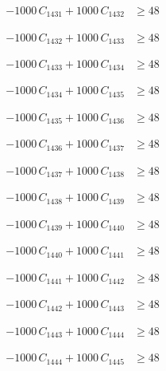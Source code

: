 \documentclass[a4paper,11pt]{article}
\begin{document}
\begin{align}
-1000\,C_{1431} + 1000\,C_{1432} &\geq 48 \nonumber
\end{align}

\begin{align}
-1000\,C_{1432} + 1000\,C_{1433} &\geq 48 \nonumber
\end{align}

\begin{align}
-1000\,C_{1433} + 1000\,C_{1434} &\geq 48 \nonumber
\end{align}

\begin{align}
-1000\,C_{1434} + 1000\,C_{1435} &\geq 48 \nonumber
\end{align}

\begin{align}
-1000\,C_{1435} + 1000\,C_{1436} &\geq 48 \nonumber
\end{align}

\begin{align}
-1000\,C_{1436} + 1000\,C_{1437} &\geq 48 \nonumber
\end{align}

\begin{align}
-1000\,C_{1437} + 1000\,C_{1438} &\geq 48 \nonumber
\end{align}

\begin{align}
-1000\,C_{1438} + 1000\,C_{1439} &\geq 48 \nonumber
\end{align}

\begin{align}
-1000\,C_{1439} + 1000\,C_{1440} &\geq 48 \nonumber
\end{align}

\begin{align}
-1000\,C_{1440} + 1000\,C_{1441} &\geq 48 \nonumber
\end{align}

\begin{align}
-1000\,C_{1441} + 1000\,C_{1442} &\geq 48 \nonumber
\end{align}

\begin{align}
-1000\,C_{1442} + 1000\,C_{1443} &\geq 48 \nonumber
\end{align}

\begin{align}
-1000\,C_{1443} + 1000\,C_{1444} &\geq 48 \nonumber
\end{align}

\begin{align}
-1000\,C_{1444} + 1000\,C_{1445} &\geq 48 \nonumber
\end{align}
\end{document}
